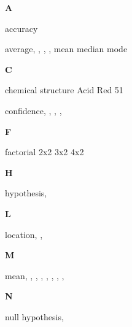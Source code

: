 \begin{theindex}

{\Large\textbf
A
}\hfill\nopagebreak

  \item accuracy\dotfill {}
  \item average\dotfill {}, , , 
		, 
    \subitem mean\dotfill {}
    \subitem median\dotfill {}
    \subitem mode\dotfill {}

  \indexspace

{\Large\textbf
C
}\hfill\nopagebreak

  \item chemical structure
    \subitem Acid Red 51\dotfill {}
  \item confidence\dotfill {}, , 
		, , 

  \indexspace

{\Large\textbf
F
}\hfill\nopagebreak

  \item factorial
    \subitem 2x2\dotfill {}
    \subitem 3x2\dotfill {}
    \subitem 4x2\dotfill {}

  \indexspace

{\Large\textbf
H
}\hfill\nopagebreak

  \item hypothesis\dotfill {}, 

  \indexspace

{\Large\textbf
L
}\hfill\nopagebreak

  \item location\dotfill {}, , 

  \indexspace

{\Large\textbf
M
}\hfill\nopagebreak

  \item mean\dotfill {}, , , 
		, , , 
		, , 

  \indexspace

{\Large\textbf
N
}\hfill\nopagebreak

  \item null hypothesis\dotfill {}, 


\end{theindex}
